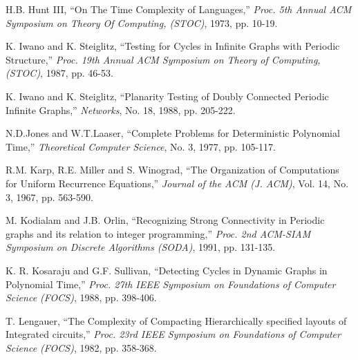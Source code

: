 \begin{thebibliography}{HMRR93}
\iffalse
\bibitem[HU]{HU} 
J. E. Hopcroft, and J. D. Ullman,
{\em Introduction to Automata Theory, Languages and Computation}
Addison Wesley, Reading MA., 1979.
\fi




 H.B. Hunt III,
``On The Time Complexity of Languages,''
{\em Proc.  5th Annual ACM Symposium on Theory Of Computing, (STOC)}, 
1973, pp. 10-19.






  K. Iwano and  K. Steiglitz,
``Testing for Cycles in  Infinite Graphs with Periodic Structure,''
{\em Proc.  19th Annual ACM Symposium on Theory of Computing, (STOC)}, 
1987, pp. 46-53.



  K. Iwano and  K. Steiglitz,
``Planarity Testing of Doubly Connected Periodic Infinite Graphs,''
{\em Networks},
No. 18, 1988, pp. 205-222.




N.D.Jones and W.T.Laaser, 
``Complete Problems for Deterministic Polynomial Time,'' 
{\em Theoretical Computer Science},
No.  3, 1977, pp. 105-117.


R.M. Karp, R.E. Miller and S. Winograd,
``The Organization of Computations for Uniform Recurrence Equations,''
{\em Journal of the ACM (J. ACM)}, Vol. 14, No. 3, 1967, pp. 563-590.




\iffalse
\bibitem[Ka72]{Ka72} 
R.M. Karp,
``Reducibility Among Combinatorial Problems,''
in R.E. Miller and J.W. Thatcher (eds)
{\em Complexity of Computer  Computations}, Plenum Press,
N.Y. 1972, pp. 85-103.
\fi


M. Kodialam and  J.B. Orlin,
``Recognizing Strong Connectivity in Periodic graphs
and its relation to integer programming,''
{\em Proc. 2nd  ACM-SIAM Symposium on Discrete Algorithms (SODA)},
1991, pp. 131-135.

  K. R. Kosaraju and G.F. Sullivan,
``Detecting Cycles in  Dynamic Graphs in Polynomial Time,''
{\em Proc.  27th IEEE Symposium on Foundations of Computer Science (FOCS)}, 
1988, pp. 398-406.

T. Lengauer,
``The Complexity of  Compacting Hierarchically specified layouts of
Integrated circuits,''
{\em Proc. 23rd IEEE Symposium on Foundations of Computer Science (FOCS)}, 
1982, pp. 358-368.


\end{thebibliography}
